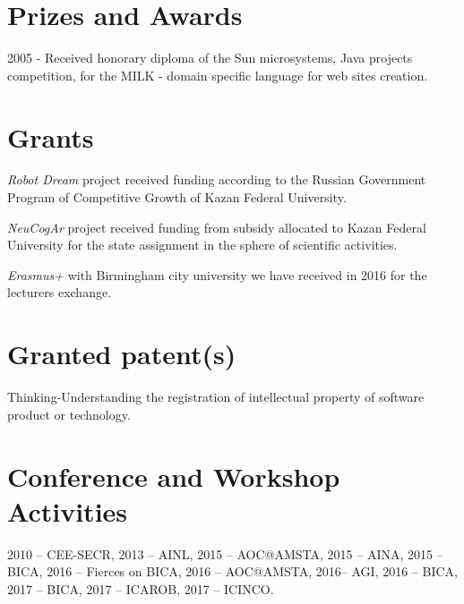 \documentclass{moderncv}
\begin{document}

\section{Prizes and Awards}

2005 - Received honorary diploma of the Sun microsystems, Java projects competition, for the MILK - domain specific language for web sites creation.

\section{Grants}

\emph{Robot Dream} project received funding according to the Russian Government Program of Competitive Growth of Kazan Federal University.

\emph{NeuCogAr} project received funding from subsidy allocated to Kazan Federal University for the state assignment in the sphere of scientific activities.

\emph{Erasmus+} with Birmingham city university we have received in 2016 for the lecturers exchange. 

\section{Granted patent(s)}

Thinking-Understanding the registration of intellectual property of software product or technology.

 
\nocite{*}
\printbibliography[title={Papers}]

\cvitem{}{}

\section{Conference and Workshop Activities}

2010 -- CEE-SECR, 2013 -- AINL, 2015 -- AOC@AMSTA, 2015 -- AINA, 2015 -- BICA, 2016 -- Fierces on BICA, 2016 -- AOC@AMSTA, 2016-- AGI, 2016 -- BICA, 2017 -- BICA, 2017 -- ICAROB, 2017 -- ICINCO.
\end{document}
